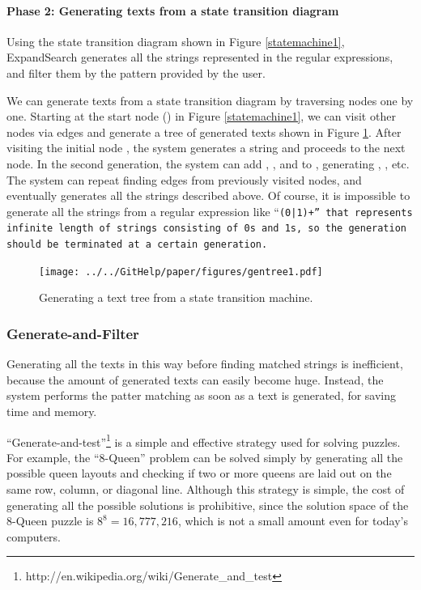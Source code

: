 \documentclass[manuscript,anonymous,review]{acmart}
\def\ES{\textsf{ExpandSearch}}
\begin{document}
\paragraph{Phase 2: Generating texts from a state transition diagram}

Using the state transition diagram shown in Figure \ref{statemachine1},
{\ES} generates all the strings represented in the regular expressions,
and filter them by the pattern provided by the user.

We can generate texts from a state transition diagram by traversing nodes one by one.
Starting at the start node
()
in Figure \ref{statemachine1},
we can visit other nodes via edges and generate a tree of generated texts
shown in Figure \ref{gentree1}.
After visiting the initial node
,
the system generates a string  and proceeds to the next node.
In the second generation,
the system can add , , and 
to , generating
, , etc.
The system can repeat finding edges from previously visited nodes,
and eventually generates all the strings described above.
Of course, it is impossible to generate all the strings
from a regular expression like ``\tt{(0|1)+}'' that represents infinite length of
strings consisting of \tt{0}s and \tt{1}s, so the generation should be
terminated at a certain generation.

\begin{figure}[htb]
\texttt{[image: ../../GitHelp/paper/figures/gentree1.pdf]}
\caption{Generating a text tree from a state transition machine.}
\label{gentree1}
\end{figure}

\subsubsection{Generate-and-Filter}

Generating all the texts in this way before finding matched strings is
inefficient, because the amount of generated texts can easily become huge.
Instead, the system performs the patter matching as soon as a text is generated,
for saving time and memory.

``Generate-and-test''\footnote{
  {\sf http:{\slash}{\slash}en.wikipedia.org{\slash}wiki{\slash}Generate\_and\_test}
}
is a simple and effective strategy used for solving puzzles.
For example,
the ``8-Queen'' problem can be solved simply by
generating all the possible queen layouts and checking if
two or more queens are laid out on the same row, column, or diagonal line.
Although this strategy is simple, the cost of
generating all the possible solutions is prohibitive, since
the solution space of the 8-Queen puzzle is $8^8 = 16,777,216$,
which is not a small amount even for today's computers.
\end{document}
